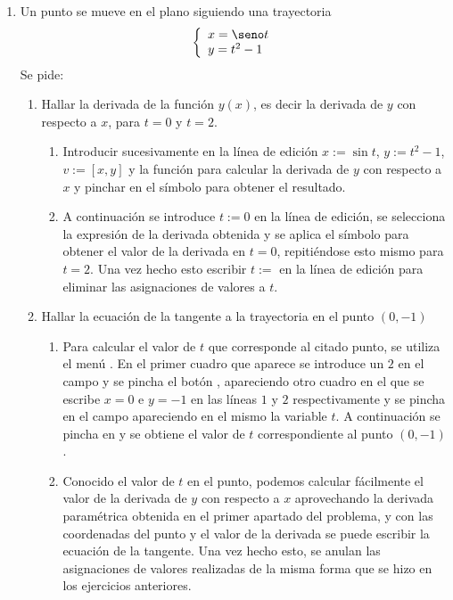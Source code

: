 \begin{enumerate}[leftmargin=*]
\item Un punto se mueve en el plano siguiendo una trayectoria
\[\left\{
\begin{array}{l}
x=\seno t\\
y=t^{2}-1
\end{array}
\right.\]
Se pide:
\begin{enumerate}
\item Hallar la derivada de la función $y(x)$, es decir la derivada de $y$ con respecto a $x$, para $t=0$ y $t=2$.
\begin{indication}
\begin{enumerate}
\item Introducir sucesivamente en la línea de edición $x:=\sin{t}$, $y:=t^{2}-1$, $v:=[x,y]$ y la función  para
calcular la derivada de $y$ con respecto a $x$ y pinchar en el símbolo \button{=} para obtener el resultado.
\item A continuación se introduce $t:=0$ en la línea de edición, se selecciona la expresión de la derivada obtenida y se aplica el símbolo
\button{$\approx$} para obtener el valor de la derivada en $t=0$, repitiéndose esto mismo para $t=2$. Una vez hecho esto escribir $t:= $ en
la línea de edición para eliminar las asignaciones de valores a $t$.
\end{enumerate}
\end{indication}

\item Hallar la ecuación de la tangente a la trayectoria en el punto $(0,-1)$
\begin{indication}
\begin{enumerate}
\item Para calcular el valor de $t$ que corresponde al citado punto, se utiliza el menú . En el primer cuadro que
aparece se introduce un $2$ en el campo  y se pincha el botón , apareciendo otro cuadro en el que se
escribe $x=0$ e $y=-1$ en las líneas $1$ y $2$ respectivamente y se pincha en el campo  apareciendo en el mismo la variable
$t$. A continuación se pincha en  y se obtiene el valor de $t$ correspondiente al punto $(0,-1)$.
\item Conocido el valor de $t$ en el punto, podemos calcular fácilmente el valor de la derivada de $y$ con respecto a $x$ aprovechando la
derivada paramétrica obtenida en el primer apartado del problema, y con las coordenadas del punto y el valor de la derivada se puede
escribir la ecuación de la tangente. Una vez hecho esto, se anulan las asignaciones de valores realizadas de la misma forma que se hizo en
los ejercicios anteriores.
\end{enumerate}
\end{indication}
\end{enumerate}
\end{enumerate}


